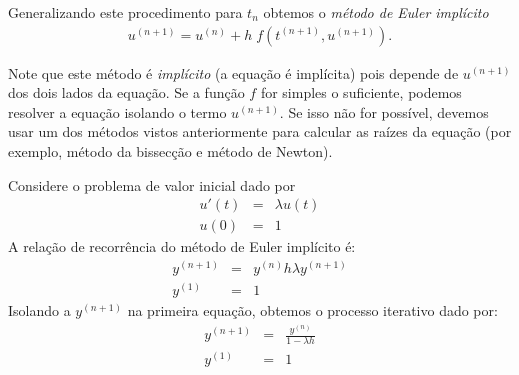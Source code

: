Generalizando este procedimento para $t_n$ obtemos o \emph{método de Euler implícito}
\begin{eqnarray}
u^{(n+1)}=u^{(n)} + h\;f(t^{(n+1)},u^{(n+1)}).
\end{eqnarray}


Note que este método é \emph{implícito} (a equação é implícita) pois depende de $u^{(n+1)}$ dos dois lados da equação. Se a função $f$ for simples o suficiente, podemos resolver a equação isolando o termo $u^{(n+1)}$. Se isso não for possível, devemos usar um dos métodos vistos anteriormente para calcular as raízes da equação (por exemplo, método da bissecção e método de Newton).

\begin{ex} Considere o problema de valor inicial dado por
\begin{eqnarray}
u'(t)&=& \lambda u(t) \\
u(0)&=&1
\end{eqnarray}
A relação de recorrência do método de Euler implícito é:
\begin{eqnarray}
 y^{(n+1)}&=&y^{(n)} h\lambda y^{(n+1)}\\
 y^{(1)}&=&1
\end{eqnarray}
Isolando a $y^{(n+1)}$ na primeira equação, obtemos o processo iterativo dado por:
\begin{eqnarray}
 y^{(n+1)}&=&\frac{y^{(n)}}{1-\lambda h}\\
 y^{(1)}&=&1
\end{eqnarray}
\end{ex}


